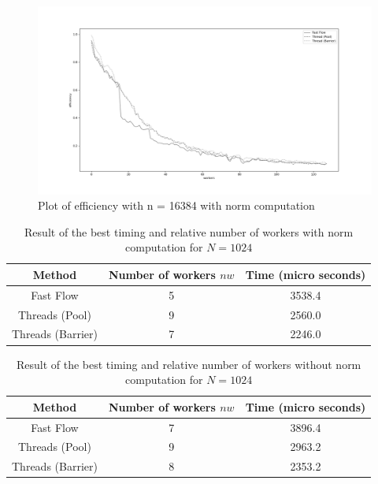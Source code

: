 \documentclass[12pt]{extarticle}
\begin{document}
\begin{figure}[H]
\centering
    \includegraphics[width=18cm, center]{./plots/efficiency_16384_1.png}
    \caption{Plot of efficiency with n = 16384 with norm computation}
\end{figure}

\begin{table}[H]
\setlength{\tabcolsep}{10pt} %
\renewcommand{\arraystretch}{1.2} %
\centering
\begin{tabular}{|ccc|}
\hline
\multicolumn{1}{|c||}{Method}   & \multicolumn{1}{c|}{Number of workers $nw$}    & \multicolumn{1}{c|}{Time (micro seconds)} \\ \hline
\multicolumn{1}{|c||}{Fast Flow} & \multicolumn{1}{c|}{5} & \multicolumn{1}{c|}{3538.4} \\ \hline
\multicolumn{1}{|c||}{Threads (Pool)}       & \multicolumn{1}{c|}{9} & \multicolumn{1}{c|}{2560.0}  \\ \hline
\multicolumn{1}{|c||}{Threads (Barrier)} & \multicolumn{1}{c|}{7} & 
\multicolumn{1}{c|}{2246.0} \\ \hline
\end{tabular}
\caption{Result of the best timing and relative number of workers with norm computation for $N=1024$}
\end{table}

\begin{table}[H]
\setlength{\tabcolsep}{10pt} %
\renewcommand{\arraystretch}{1.2} %
\centering
\begin{tabular}{|ccc|}
\hline
\multicolumn{1}{|c||}{Method}   & \multicolumn{1}{c|}{Number of workers $nw$}    & \multicolumn{1}{c|}{Time (micro seconds)} \\ \hline
\multicolumn{1}{|c||}{Fast Flow} & \multicolumn{1}{c|}{7} & \multicolumn{1}{c|}{3896.4} \\ \hline
\multicolumn{1}{|c||}{Threads (Pool)}       & \multicolumn{1}{c|}{9} & \multicolumn{1}{c|}{2963.2}  \\ \hline
\multicolumn{1}{|c||}{Threads (Barrier)} & \multicolumn{1}{c|}{8} & 
\multicolumn{1}{c|}{2353.2} \\ \hline
\end{tabular}
\caption{Result of the best timing and relative number of workers without norm computation for $N=1024$}
\end{table}
\end{document}
